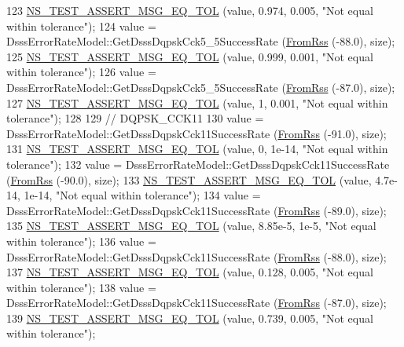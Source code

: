 \begin{DoxyCode}
123   \hyperlink{group__testing_ga9e7861b56b4e70db3b56044cb7a28e41}{NS\_TEST\_ASSERT\_MSG\_EQ\_TOL} (value, 0.974, 0.005, \textcolor{stringliteral}{"Not equal within tolerance"});
124   value = DsssErrorRateModel::GetDsssDqpskCck5\_5SuccessRate (\hyperlink{wifi-error-rate-models-test_8cc_a04e29db50fb1c1d787cf553ee9453e90}{FromRss} (-88.0), size);
125   \hyperlink{group__testing_ga9e7861b56b4e70db3b56044cb7a28e41}{NS\_TEST\_ASSERT\_MSG\_EQ\_TOL} (value, 0.999, 0.001, \textcolor{stringliteral}{"Not equal within tolerance"});
126   value = DsssErrorRateModel::GetDsssDqpskCck5\_5SuccessRate (\hyperlink{wifi-error-rate-models-test_8cc_a04e29db50fb1c1d787cf553ee9453e90}{FromRss} (-87.0), size);
127   \hyperlink{group__testing_ga9e7861b56b4e70db3b56044cb7a28e41}{NS\_TEST\_ASSERT\_MSG\_EQ\_TOL} (value, 1, 0.001, \textcolor{stringliteral}{"Not equal within tolerance"});
128 
129   \textcolor{comment}{// DQPSK\_CCK11}
130   value = DsssErrorRateModel::GetDsssDqpskCck11SuccessRate (\hyperlink{wifi-error-rate-models-test_8cc_a04e29db50fb1c1d787cf553ee9453e90}{FromRss} (-91.0), size);
131   \hyperlink{group__testing_ga9e7861b56b4e70db3b56044cb7a28e41}{NS\_TEST\_ASSERT\_MSG\_EQ\_TOL} (value, 0, 1e-14, \textcolor{stringliteral}{"Not equal within tolerance"});
132   value = DsssErrorRateModel::GetDsssDqpskCck11SuccessRate (\hyperlink{wifi-error-rate-models-test_8cc_a04e29db50fb1c1d787cf553ee9453e90}{FromRss} (-90.0), size);
133   \hyperlink{group__testing_ga9e7861b56b4e70db3b56044cb7a28e41}{NS\_TEST\_ASSERT\_MSG\_EQ\_TOL} (value, 4.7e-14, 1e-14, \textcolor{stringliteral}{"Not equal within tolerance"});
134   value = DsssErrorRateModel::GetDsssDqpskCck11SuccessRate (\hyperlink{wifi-error-rate-models-test_8cc_a04e29db50fb1c1d787cf553ee9453e90}{FromRss} (-89.0), size);
135   \hyperlink{group__testing_ga9e7861b56b4e70db3b56044cb7a28e41}{NS\_TEST\_ASSERT\_MSG\_EQ\_TOL} (value, 8.85e-5, 1e-5, \textcolor{stringliteral}{"Not equal within tolerance"});
136   value = DsssErrorRateModel::GetDsssDqpskCck11SuccessRate (\hyperlink{wifi-error-rate-models-test_8cc_a04e29db50fb1c1d787cf553ee9453e90}{FromRss} (-88.0), size);
137   \hyperlink{group__testing_ga9e7861b56b4e70db3b56044cb7a28e41}{NS\_TEST\_ASSERT\_MSG\_EQ\_TOL} (value, 0.128, 0.005, \textcolor{stringliteral}{"Not equal within tolerance"});
138   value = DsssErrorRateModel::GetDsssDqpskCck11SuccessRate (\hyperlink{wifi-error-rate-models-test_8cc_a04e29db50fb1c1d787cf553ee9453e90}{FromRss} (-87.0), size);
139   \hyperlink{group__testing_ga9e7861b56b4e70db3b56044cb7a28e41}{NS\_TEST\_ASSERT\_MSG\_EQ\_TOL} (value, 0.739, 0.005, \textcolor{stringliteral}{"Not equal within tolerance"});

\end{DoxyCode}
